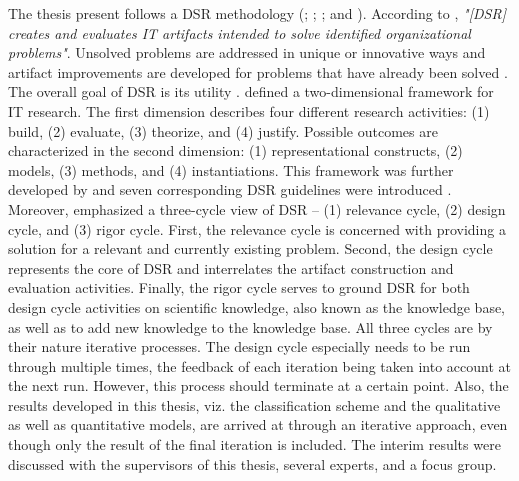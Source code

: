 The thesis present follows a \acf{DSR} methodology (\citealp{March1995}; \citealp{Hevner2004}; \citealp{Hevner2007}; and \citealp{Peffers2007}). According to \citet[p. 77]{Hevner2004}, \textit{"[\ac{DSR}] creates and evaluates IT artifacts intended to solve identified organizational problems"}. Unsolved problems are addressed in unique or innovative ways and artifact improvements are developed for problems that have already been solved \citep[p. 81]{Hevner2004}. The overall goal of \ac{DSR} is its utility \citep[p. 80]{Hevner2004}. \citet[pp. 255-262]{March1995} defined a two-dimensional framework for \ac{IT} research. The first dimension describes four different research activities: (1) build, (2) evaluate, (3) theorize, and (4) justify. Possible outcomes are characterized in the second dimension: (1) representational constructs, (2) models, (3) methods, and (4) instantiations. This framework was further developed by \citet[pp. 78-81]{Hevner2004} and seven corresponding \ac{DSR} guidelines were introduced \citep[pp. 82-90]{Hevner2004}. Moreover, \citet[pp. 87-92]{Hevner2007} emphasized a three-cycle view of \ac{DSR} -- (1) relevance cycle, (2) design cycle, and (3) rigor cycle. First, the relevance cycle is concerned with providing a solution for a relevant and currently existing problem. Second, the design cycle represents the core of \ac{DSR} and interrelates the artifact construction and evaluation activities. Finally, the rigor cycle serves to ground \ac{DSR} for both design cycle activities on scientific knowledge, also known as the knowledge base, as well as to add new knowledge to the knowledge base. All three cycles are by their nature iterative processes. The design cycle especially needs to be run through multiple times, the feedback of each iteration being taken into account at the next run. However, this process should terminate at a certain point. Also, the results developed in this thesis, viz. the classification scheme and the qualitative as well as quantitative models, are arrived at through an iterative approach, even though only the result of the final iteration is included. The interim results were discussed with the supervisors of this thesis, several experts, and a focus group.

